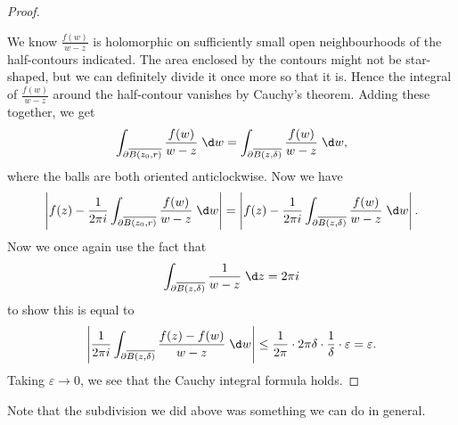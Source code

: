 \documentclass[a4paper]{article}
\begin{document}
\begin{proof}
\begin{center}
  \end{center}
  We know $\frac{f(w)}{w - z}$ is holomorphic on sufficiently small open neighbourhoods of the half-contours indicated. The area enclosed by the contours might not be star-shaped, but we can definitely divide it once more so that it is. Hence the integral of $\frac{f(w)}{w - z}$ around the half-contour vanishes by Cauchy's theorem. Adding these together, we get
  \[
    \int_{\partial \overline{B(z_0, r)}} \frac{f(w)}{w - z}\;\d w = \int_{\partial \overline{B(z, \delta)}} \frac{f(w)}{w - z}\;\d w,
  \]
  where the balls are both oriented anticlockwise. Now we have
  \[
    \left|f(z) - \frac{1}{2\pi i} \int_{\partial \overline{B(z_0, r)}} \frac{f(w)}{w - z}\;\d w\right| = \left|f(z) - \frac{1}{2\pi i} \int_{\partial \overline{B(z, \delta)}} \frac{f(w)}{w - z}\;\d w\right|.
  \]
  Now we once again use the fact that
  \[
    \int_{\partial \overline{B(z, \delta)}} \frac{1}{w - z}\;\d z = 2\pi i
  \]
  to show this is equal to
  \[
    \left|\frac{1}{2\pi i} \int_{\partial \overline{B(z, \delta)}} \frac{f(z) - f(w)}{w - z} \;\d w\right| \leq \frac{1}{2\pi} \cdot 2\pi \delta \cdot \frac{1}{\delta} \cdot \varepsilon = \varepsilon.
  \]
  Taking $\varepsilon \to 0$, we see that the Cauchy integral formula holds.
\end{proof}
Note that the subdivision we did above was something we can do in general.
\end{document}
